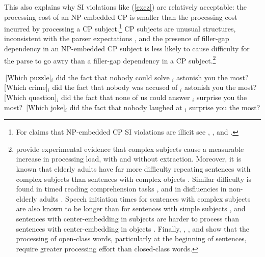\documentclass[output=paper]{langsci/langscibook}
\begin{document}
This also explains why SI violations like  (\ref{excz}) are relatively acceptable: the  processing cost of an NP-embedded CP  is smaller than the processing cost incurred by processing a CP subject.\footnote{For claims that NP-embedded CP SI violations are illicit see  \citep[42]{lasniksaito},   \citep[796]{colinphillips}, and    \citep[67]{colin_horn}.}  CP subjects are unusual structures, inconsistent with the parser expectations \citep{fod74},  and   the presence of filler-gap dependency in an  NP-embedded CP subject is less likely
to cause  difficulty for the parse to go awry than a  filler-gap dependency in a CP subject.\footnote{\citet{clausen,clausencuny} provide  experimental evidence that  complex subjects cause  a measurable increase in processing load,  with and without extraction. Moreover,  it is known that 
elderly adults  have far more difficulty repeating sentences with complex subjects than sentences with complex objects  \citep{kemper86}. Similar difficulty is  found in timed reading comprehension tasks  \citep{kynette}, and in   disfluencies in non-elderly adults \citep{clarkwasow}. 
Speech initiation times  for sentences with complex subjects are
also known to be longer than for sentences with 
 simple subjects  \citep{ferreirasubj,tsiam},
 and sentences with center-embedding in subjects 
are harder to process than sentences 
with center-embedding in objects \citep{amy,eady}.
Finally,  \citet{garnsey}, \citet{kutasetal}, and \citet{vanpetten}  show
that the processing of open-class words, particularly at
the beginning of sentences, require
greater processing effort than closed-class words.}


\ea
\ea  \,[Which puzzle]$_i$ did the fact that nobody could solve \spc$_i$ astonish you the most?
\ex \,[Which crime]$_i$ did the fact that nobody was accused of \spc$_i$ astonish you the most?
\ex \,[Which question]$_i$ did the fact that none of us could answer \spc$_i$  surprise you the most?
\ex \,[Which joke]$_i$ did the fact that nobody laughed at \spc$_i$ surprise you the most?
\z \label{excz}
\z
\end{document}
